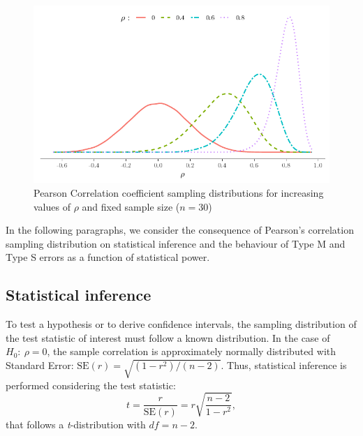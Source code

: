 \documentclass{article}\usepackage[]{graphicx}\usepackage[]{color}
\makeatletter
\def\maxwidth{ %
  \ifdim\Gin@nat@width>\linewidth
    \linewidth
  \else
    \Gin@nat@width
  \fi
}
\newenvironment{knitrout}{}{} %
\makeatother
\begin{document}
\begin{refsection}
\begin{knitrout}
\color{fgcolor}\begin{figure}[!h]

{\centering \includegraphics[width=\maxwidth]{figure/Plot_sampling_rho-1} 

}

\caption[Pearson Correlation coefficient sampling distributions for increasing values of $\rho$ and fixed sample size ($n = 30$)]{Pearson Correlation coefficient sampling distributions for increasing values of $\rho$ and fixed sample size ($n = 30$)}\label{fig:Plot_sampling_rho}
\end{figure}


\end{knitrout}

In the following paragraphs, we consider the consequence of Pearson's correlation sampling distribution on statistical inference and the behaviour of Type M and Type S errors as a function of statistical power.

\subsection{Statistical inference}

To test a hypothesis or to derive confidence intervals, the sampling distribution of the test statistic of interest must follow a known distribution. In the case of $H_0:\ \rho = 0$, the sample correlation is approximately normally distributed with Standard Error: $\text{SE}(r) = \sqrt{(1-r^2)/(n-2)}$. Thus, statistical inference is performed considering the test statistic:
\begin{equation}
  t = \frac{r}{\text{SE}(r)} = r \sqrt{\frac{n-2}{1-r^2}},
\end{equation}
that follows a \emph{t}-distribution with $df = n-2$.


\end{refsection}
\end{document}
